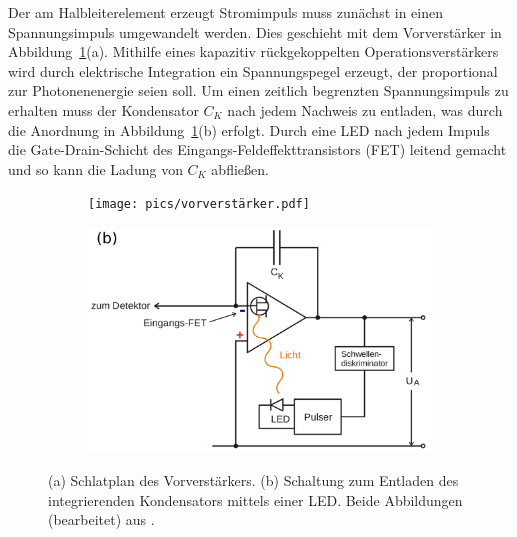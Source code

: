 Der am Halbleiterelement erzeugt Stromimpuls muss zunächst in einen Spannungsimpuls umgewandelt werden. Dies geschieht mit 
dem Vorverstärker in Abbildung~\ref{fig: vorverstaerker}(a). Mithilfe eines kapazitiv rückgekoppelten Operationsverstärkers wird durch elektrische 
Integration ein Spannungspegel erzeugt, der proportional zur Photonenenergie seien soll. Um einen zeitlich 
begrenzten Spannungsimpuls zu erhalten muss der Kondensator $C_K$ nach jedem Nachweis zu entladen, was durch die 
Anordnung in Abbildung~\ref{fig: vorverstaerker}(b) erfolgt. Durch eine LED nach jedem Impuls die Gate-Drain-Schicht des 
Eingangs-Feldeffekttransistors (FET) leitend gemacht und so kann die Ladung von $C_K$ abfließen.
\begin{figure}
\centering
\begin{subfigure}{0.49\textwidth}
\centering
\texttt{[image: pics/vorverstärker.pdf]}
\end{subfigure}
\begin{subfigure}{0.49\textwidth}
\centering
\includegraphics[width = \textwidth]{pics/led.pdf}
\end{subfigure}
\caption{(a) Schlatplan des Vorverstärkers. (b) Schaltung zum Entladen des integrierenden Kondensators mittels einer LED.
Beide Abbildungen (bearbeitet) aus \cite{anleitungv18}.}
\label{fig: vorverstaerker}
\end{figure}

